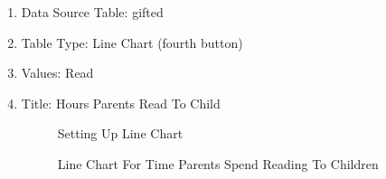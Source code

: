 \begin{enumerate}
  
  \item Data Source Table: gifted
  \item Table Type: Line Chart (fourth button)
  \item Values: Read
  \item Title: Hours Parents Read To Child
  
  \begin{figure}[H]
    \begin{center}
      \caption{Setting Up Line Chart}
    \end{center}
  \end{figure}

  \begin{figure}[H]
    \begin{center}
      \caption{Line Chart For Time Parents Spend Reading To Children}
    \end{center}
  \end{figure}
  
\end{enumerate}

